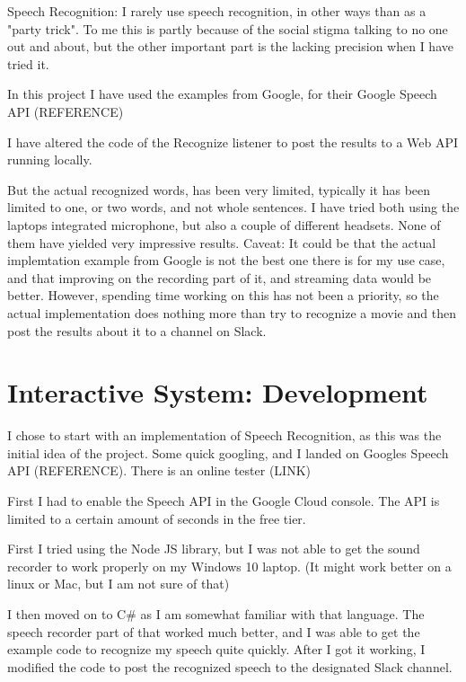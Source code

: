 \documentclass[11pt,fleqn]{book} %
\begin{document}
Speech Recognition:
I rarely use speech recognition, in other ways than as a "party trick". To me this is partly because of the social stigma talking to no one out and about, but the other important part is the lacking precision when I have tried it.

In this project I have used the examples from Google, for their Google Speech API
(REFERENCE)

I have altered the code of the Recognize listener to post the results to a Web API running locally.

But the actual recognized words, has been very limited, typically it has been limited to one, or two words, and not whole sentences.
I have tried both using the laptops integrated microphone, but also a couple of different headsets. None of them have yielded very impressive results.
Caveat: It could be that the actual implemtation example from Google is not the best one there is for my use case, and that improving on the recording part of it, and streaming data would be better. However, spending time working on this has not been a priority, so the actual implementation does nothing more than try to recognize a movie and then post the results about it to a channel on Slack.





\chapter{Interactive System: Development}
I chose to start with an implementation of Speech Recognition, as this was the initial idea of the project.
Some quick googling, and I landed on Googles Speech API (REFERENCE). There is an online tester (LINK)

First I had to enable the Speech API in the Google Cloud console. The API is limited to a certain amount of seconds in the free tier.

First I tried using the Node JS library, but I was not able to get the sound recorder to work properly on my Windows 10 laptop. (It might work better on a linux or Mac, but I am not sure of that)

I then moved on to C\# as I am somewhat familiar with that language. The speech recorder part of that worked much better, and I was able to get the example code to recognize my speech quite quickly.
After I got it working, I modified the code to post the recognized speech to the designated Slack channel.
\end{document}
